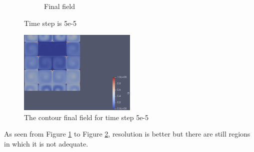 \documentclass{article}
\begin{document}
\begin{figure}[hbt!]
\begin{subfigure}{0.4\textwidth}
        \caption{Final field}
  \end{subfigure}
  \caption{Time step is 5e-5}
  \label{t2m4_1} 
\end{figure}

\begin{figure}[hbt!]
    \centering
    \includegraphics[width=0.5\textwidth]{Figures/5e-5 160x160/contour.png}
    \caption{The contour final field for time step 5e-5}
    \label{t2m4_2} 
\end{figure}

As seen from Figure \ref{t2m4_1} to Figure \ref{t2m4_2}, resolution is better but there are still regions in which it is not adequate.



\clearpage
\end{document}
